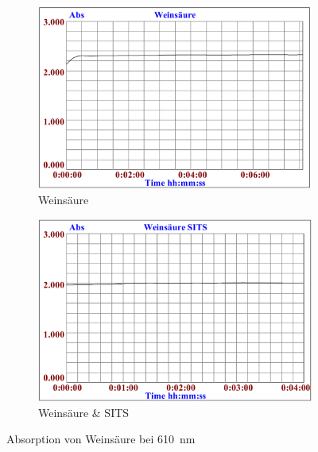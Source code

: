 \documentclass[a4paper,german]{scrreprt}
\begin{document}
\begin{figure}
	\centering
	\begin{subfigure}{.5\textwidth}
		\centering
		\includegraphics[width=\linewidth]{img/haem_wein.png}
		\caption{Weinsäure}
	\end{subfigure}%
	\begin{subfigure}{.5\textwidth}
		\centering
		\includegraphics[width=\linewidth]{img/haem_wein_sits.png}
		\caption{Weinsäure \& SITS}
	\end{subfigure}
	\caption{Absorption von Weinsäure bei \SI{610}{nm}}
	\label{fig:haem_wein}
\end{figure}
\end{document}
